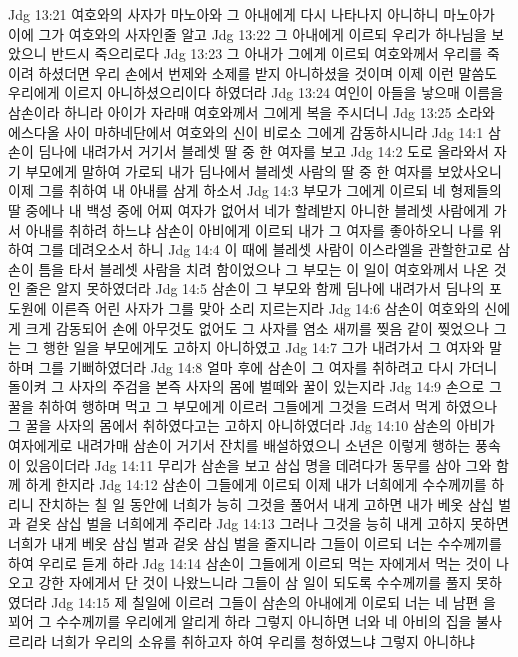 Jdg 13:21  여호와의 사자가 마노아와 그 아내에게 다시 나타나지 아니하니 마노아가 이에 그가 여호와의 사자인줄 알고
Jdg 13:22  그 아내에게 이르되 우리가 하나님을 보았으니 반드시 죽으리로다
Jdg 13:23  그 아내가 그에게 이르되 여호와께서 우리를 죽이려 하셨더면 우리 손에서 번제와 소제를 받지 아니하셨을 것이며 이제 이런 말씀도 우리에게 이르지 아니하셨으리이다 하였더라
Jdg 13:24  여인이 아들을 낳으매 이름을 삼손이라 하니라 아이가 자라매 여호와께서 그에게 복을 주시더니
Jdg 13:25  소라와 에스다올 사이 마하네단에서 여호와의 신이 비로소 그에게 감동하시니라
Jdg 14:1  삼손이 딤나에 내려가서 거기서 블레셋 딸 중 한 여자를 보고
Jdg 14:2  도로 올라와서 자기 부모에게 말하여 가로되 내가 딤나에서 블레셋 사람의 딸 중 한 여자를 보았사오니 이제 그를 취하여 내 아내를 삼게 하소서
Jdg 14:3  부모가 그에게 이르되 네 형제들의 딸 중에나 내 백성 중에 어찌 여자가 없어서 네가 할례받지 아니한 블레셋 사람에게 가서 아내를 취하려 하느냐 삼손이 아비에게 이르되 내가 그 여자를 좋아하오니 나를 위하여 그를 데려오소서 하니
Jdg 14:4  이 때에 블레셋 사람이 이스라엘을 관할한고로 삼손이 틈을 타서 블레셋 사람을 치려 함이었으나 그 부모는 이 일이 여호와께서 나온 것인 줄은 알지 못하였더라
Jdg 14:5  삼손이 그 부모와 함께 딤나에 내려가서 딤나의 포도원에 이른즉 어린 사자가 그를 맞아 소리 지르는지라
Jdg 14:6  삼손이 여호와의 신에게 크게 감동되어 손에 아무것도 없어도 그 사자를 염소 새끼를 찢음 같이 찢었으나 그는 그 행한 일을 부모에게도 고하지 아니하였고
Jdg 14:7  그가 내려가서 그 여자와 말하며 그를 기뻐하였더라
Jdg 14:8  얼마 후에 삼손이 그 여자를 취하려고 다시 가더니 돌이켜 그 사자의 주검을 본즉 사자의 몸에 벌떼와 꿀이 있는지라
Jdg 14:9  손으로 그 꿀을 취하여 행하며 먹고 그 부모에게 이르러 그들에게 그것을 드려서 먹게 하였으나 그 꿀을 사자의 몸에서 취하였다고는 고하지 아니하였더라
Jdg 14:10  삼손의 아비가 여자에게로 내려가매 삼손이 거기서 잔치를 배설하였으니 소년은 이렇게 행하는 풍속이 있음이더라
Jdg 14:11  무리가 삼손을 보고 삼십 명을 데려다가 동무를 삼아 그와 함께 하게 한지라
Jdg 14:12  삼손이 그들에게 이르되 이제 내가 너희에게 수수께끼를 하리니 잔치하는 칠 일 동안에 너희가 능히 그것을 풀어서 내게 고하면 내가 베옷 삼십 벌과 겉옷 삼십 벌을 너희에게 주리라
Jdg 14:13  그러나 그것을 능히 내게 고하지 못하면 너희가 내게 베옷 삼십 벌과 겉옷 삼십 벌을 줄지니라 그들이 이르되 너는 수수께끼를 하여 우리로 듣게 하라
Jdg 14:14  삼손이 그들에게 이르되 먹는 자에게서 먹는 것이 나오고 강한 자에게서 단 것이 나왔느니라 그들이 삼 일이 되도록 수수께끼를 풀지 못하였더라
Jdg 14:15  제 칠일에 이르러 그들이 삼손의 아내에게 이로되 너는 네 남편 을 꾀어 그 수수께끼를 우리에게 알리게 하라 그렇지 아니하면 너와 네 아비의 집을 불사르리라 너희가 우리의 소유를 취하고자 하여 우리를 청하였느냐 그렇지 아니하냐
